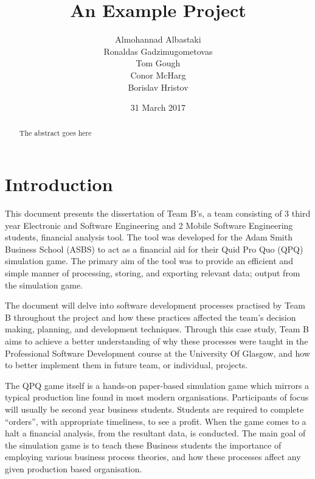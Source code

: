 \documentclass{l3proj}
\begin{document}
\title{An Example Project}

\author{Almohannad Albastaki \\
        Ronaldas Gadzimugometovas \\
        Tom Gough \\
     	Conor McHarg \\
        Borislav Hristov}

\date{31 March 2017}

\maketitle

\begin{abstract}

The abstract goes here

\end{abstract}

\educationalconsent

\newpage

\section{Introduction}
\label{sec:introduction}

This document presents the dissertation of Team B’s, a team consisting of 3 third year Electronic and Software Engineering and 2 Mobile Software Engineering students, financial analysis tool. The tool was developed for the Adam Smith Business School (ASBS) to act as a financial aid for their Quid Pro Quo (QPQ) simulation game. The primary aim of the tool was to provide an efficient and simple manner of processing, storing, and exporting relevant data; output from the simulation game.

    The document will delve into software development processes practised by Team B throughout the project and how these practices affected the team’s decision making, planning, and development techniques. Through this case study, Team B aims to achieve a better understanding of why these processes were taught in the Professional Software Development course at the University Of Glasgow, and how to better implement them in future team, or individual, projects.

    The QPQ game itself is a hands-on paper-based simulation game which mirrors a typical production line found in most modern organisations. Participants of focus will usually be second year business students. Students are required to complete “orders”, with appropriate timeliness, to see a profit. When the game comes to a halt a financial analysis, from the resultant data, is conducted. The main goal of the simulation game is to teach these Business students the importance of employing various business process theories, and how these processes affect any given production based organisation.  
\end{document}
